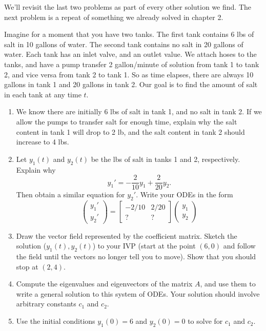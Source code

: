 We'll revisit the last two problems as part of every other solution we find.  
The next problem is a repeat of something we already solved in chapter 2. 

\begin{problem}
 Imagine for a moment that you have two tanks. The first tank contains 6 lbs of salt in 10 gallons of water. The second tank contains no salt in 20 gallons of water.  Each tank has an inlet valve, and an outlet value.  We attach hoses to the tanks, and have a pump transfer 2 gallon/minute of solution from tank 1 to tank 2, and vice versa from tank 2 to tank 1. So as time elapses, there are always 10 gallons in tank 1 and 20 gallons in tank 2. Our goal is to find the amount of salt in each tank at any time $t$. 
\begin{enumerate}
 \item We know there are initially 6 lbs of salt in tank 1, and no salt in tank 2. If we allow the pumps to transfer salt for enough time, explain why the salt content in tank 1 will drop to 2 lb, and the salt content in tank 2 should increase to 4 lbs.
 \item Let $y_1(t)$ and $y_2(t)$ be the lbs of salt in tanks 1 and 2, respectively.  Explain why 
$$y_1 ' = -\frac{2}{10}y_1+\frac{2}{20}y_2.$$
 Then obtain a similar equation for $y_2'$. Write your ODEs in the form 
$$
\begin{pmatrix}
 y_1'\\y_2'
\end{pmatrix}
=
\begin{bmatrix}
 -2/10 & 2/20\\
 ? & ?
\end{bmatrix}
\begin{pmatrix}
 y_1\\y_2
\end{pmatrix}
$$
\item Draw the vector field represented by the coefficient matrix. Sketch the solution ($y_1(t),y_2(t)$) to your IVP (start at the point $(6,0)$ and follow the field until the vectors no longer tell you to move).  Show that you should stop at $(2,4)$.
\item {}%
Compute the eigenvalues and eigenvectors of the matrix $A$, and use them to write a general solution to this system of ODEs. Your solution should involve arbitrary constants $c_1$ and $c_2$.
 \item 
Use the initial conditions $y_1(0)=6$ and $y_2(0)=0$ to solve for $c_1$ and $c_2$.
\end{enumerate}

\end{problem}


